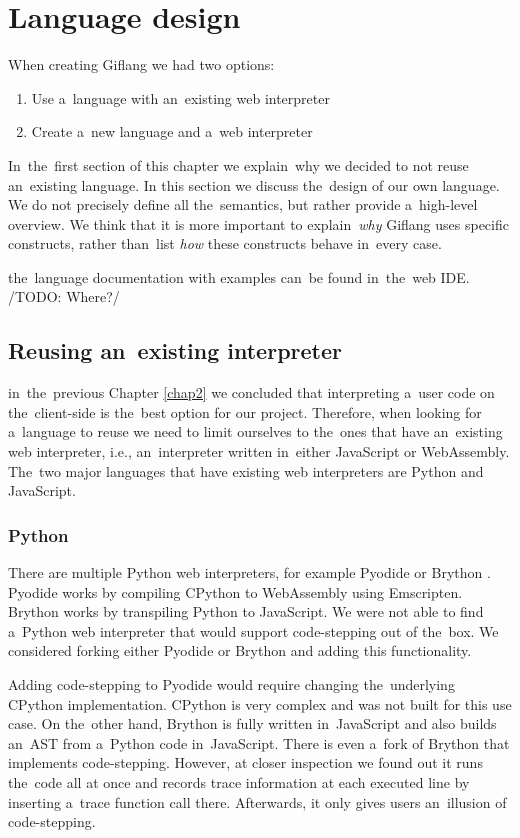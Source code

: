
\chapter{Language design}
\label{chap3:language_design}

When creating Giflang we had two options:
\begin{enumerate}
    \item Use a~language with an~existing web interpreter
    \item Create a~new language and a~web interpreter
\end{enumerate}

In~the~first section of this chapter we explain~why we decided to not reuse an~existing language. In this section we discuss the~design of our own language. We do not
precisely define all the~semantics, but rather provide a~high-level overview. We think that it is more important to explain~\emph{why} Giflang uses specific
constructs, rather than~list \emph{how} these constructs behave in~every case.

the~language documentation with examples can~be found in~the~web IDE. /TODO: Where?/

\section{Reusing an~existing interpreter}
in~the~previous Chapter \ref{chap2} we concluded that interpreting a~user code on the~client-side is the~best option for our project. Therefore, when
looking for a~language to reuse we need to limit ourselves to the~ones that have an~existing web interpreter, i.e., an~interpreter written in~either
JavaScript or WebAssembly. The~two major languages that have existing web interpreters are Python and JavaScript.

\subsection{Python}
There are multiple Python web interpreters, for example Pyodide \cite{Pyodide} or Brython \cite{Brython}. Pyodide works by compiling CPython \cite{CPython}
to WebAssembly using Emscripten. Brython works by transpiling Python to JavaScript. We were not able to find a~Python web interpreter that would
support code-stepping out of the~box. We considered forking either Pyodide or Brython and adding this functionality.

Adding code-stepping to Pyodide would require changing the~underlying CPy\-thon implementation. CPython is very complex and was not built for this use case.
On the~other hand, Brython is fully written in~JavaScript and also builds an~AST from a~Python code in~JavaScript. There
is even a~fork of Brython \cite{PythonDebugger} that implements code-stepping. However, at closer inspection we found out it runs the~code all at once and records trace information
at each executed line by inserting a~trace function call there. Afterwards, it only gives users an~illusion of code-stepping.


